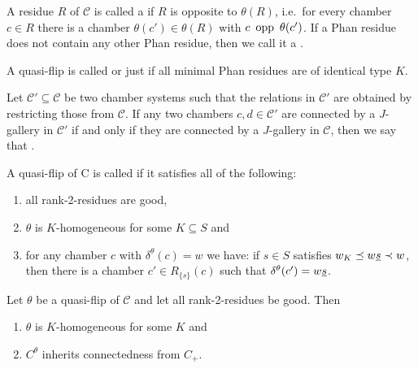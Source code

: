 \begin{defi}
	A residue $R$ of $\mathcal{C}$ is called a  if $R$ is opposite to $\theta(R)$, i.e.\ for every chamber $c \in R$ there is a chamber $\theta(c') \in \theta(R)$ with $c \opp \theta(c')$. If a Phan residue does not contain any other Phan residue, then we call it a .
\end{defi}

\begin{defi}
	A quasi-flip is called  or just  if all minimal Phan residues are of identical type $K$.
\end{defi}

\begin{defi}
	Let $\mathcal C' \subseteq \mathcal C$ be two chamber systems such that the relations in $\mathcal C'$ are obtained by restricting those from $\mathcal C$. If any two chambers $c,d \in \mathcal C'$ are connected by a $J$-gallery in $\mathcal C'$ if and only if they are connected by a $J$-gallery in $\mathcal C$, then we say that .
\end{defi}

\begin{defi}
	A quasi-flip of C is called  if it satisfies all of the following:
	\begin{enumerate}
		\item all rank-2-residues are good,
		\item $\theta$ is $K$-homogeneous for some $K \subseteq S$ and
		\item for any chamber $c$ with $\delta^\theta(c) = w$ we have: if $s \in S$ satisfies $w_K \preceq w \underline{s} \prec w$, then there is a chamber $c' \in R_{\{s\}}(c)$ such that $\delta^\theta(c') = w \underline{s}$.
	\end{enumerate}
\end{defi}

\begin{prop}
	Let $\theta$ be a quasi-flip of $\mathcal{C}$ and let all rank-2-residues be good. Then
	\begin{enumerate}
		\item $\theta$ is $K$-homogeneous for some $K$ and
		\item $C^\theta$ inherits connectedness from $C_+$.
	\end{enumerate}
\end{prop}

